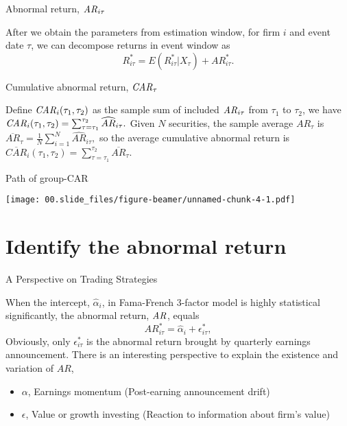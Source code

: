 \documentclass[
11pt,
ignorenonframetext,
]{beamer}
\begin{document}
\begin{frame}{}
\protect\hypertarget{section-1}{}

\begin{block}{Abnormal return, \({\it AR}_{i\tau}\)}

After we obtain the parameters from estimation window, for firm \(i\)
and event date \(\tau\), we can decompose returns in event window as \[
R_{i\tau}^{*} =  E(R_{i\tau}^{*} | X_\tau) + AR_{i\tau}^{*}.
\]

\end{block}

\begin{block}{Cumulative abnormal return, \({\it CAR}_\tau\)}

Define \({\it CAR}_i(\tau_1,\tau_2)\) as the sample sum of included
\({\it AR}_{i\tau}\) from \(\tau_1\) to \(\tau_2\), we have
\({\it CAR}_i(\tau_1, \tau_2) = \sum_{\tau=\tau_1}^{\tau_2} {\widehat{AR}_{i\tau}}.\)
Given \(N\) securities, the sample average \(AR_\tau\) is
\(\overline{AR}_\tau = \frac{1}{N} \sum_{i=1}^N \widehat{AR}_{i\tau},\)
so the average cumulative abnormal return is
\(\overline{CAR}_i(\tau_1, \tau_2) = \sum_{\tau=\tau_1}^{\tau_2} {\overline{AR}_{\tau}}.\)

\end{block}

\end{frame}

\begin{frame}{Path of group-CAR}
\protect\hypertarget{path-of-group-car}{}

\texttt{[image: 00.slide\_files/figure-beamer/unnamed-chunk-4-1.pdf]}

\end{frame}

\hypertarget{identify-the-abnormal-return}{%
\section{Identify the abnormal
return}\label{identify-the-abnormal-return}}

\begin{frame}{A Perspective on Trading Strategies}
\protect\hypertarget{a-perspective-on-trading-strategies}{}

When the intercept, \(\hat \alpha_i\), in Fama-French 3-factor model is
highly statistical significantly, the abnormal return, \({\it AR}\),
equals \begin{equation}
AR_{i\tau}^* = \hat\alpha_i + \epsilon_{i\tau}^*, 
\end{equation} Obviously, only \(\epsilon_{i\tau}^{*}\) is the abnormal
return brought by quarterly earnings announcement. There is an
interesting perspective to explain the existence and variation of
\(AR\),

\begin{itemize}
\item
  \(\alpha\), Earnings momentum (Post-earning announcement drift)
\item
  \(\epsilon\), Value or growth investing (Reaction to information about
  firm's value)
\end{itemize}

\end{frame}
\end{document}
